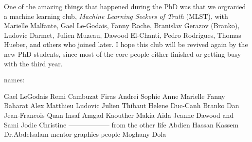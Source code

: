 \par One of the amazing things that happened during the PhD was that we orgranied a machine learning club, \textit{Machine Learning Seekers of Truth} (MLST), with Marielle Malfante, Gael Le-Godais, Fanny Roche, Branislav Gerazov (Branko), Ludovic Darmet, Julien Muzeau, Dawood El-Chanti, Pedro Rodrigues, Thomas Hueber, and others who joined later. I hope this club will be revived again by the new PhD students, since most of the core people either finished or getting busy with the third year.

names:

Gael LeGodais
Remi Cambuzat
Firas
Andrei
Sophie
Anne
Marielle
Fanny
Baharat
Alex
Matthieu
Ludovic
Julien
Thibaut
Helene
Duc-Canh
Branko
Dan
Jean-Francois
Quan
Insaf
Amgad
Kaouther
Makia
Aida
Jeanne
Dawood and Sami
Jodie
Christine
------------------
from the other life
Abdien
Hassan
Kassem
Dr.Abdelsalam
mentor graphics people
Moghany
Dola
